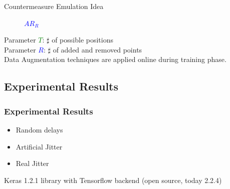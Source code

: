 \begin{frame}
\begin{block}{Countermeasure Emulation Idea}
\begin{figure}
\begin{minipage}[b]{0.5\linewidth}
    \caption{\textcolor{blue}{$AR_R$}}
  \end{minipage} 
\end{figure}
\vspace{-9pt}
Parameter  \textcolor{green}{$T$}: $\sharp$ of possible positions \\
Parameter \textcolor{blue}{$R$}: $\sharp$ of added and removed points \\
Data Augmentation techniques are applied online during training phase.
\end{block}
\end{frame}


\subsection{Experimental Results}
\begin{frame}
\frametitle{Experimental Results}
\begin{itemize}
\item Random delays
\item Artificial Jitter
\item Real Jitter
\end{itemize}

\vspace*{3pt}
Keras 1.2.1 library with Tensorflow backend \cite{keras} (open source, today 2.2.4)


\end{frame}

